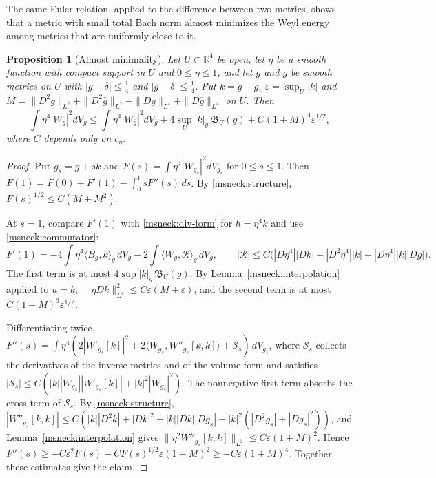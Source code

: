 \documentclass[11pt]{article}
\numberwithin{equation}{section}
\newtheorem{proposition}[theorem]{Proposition}
\theoremstyle{definition}
\theoremstyle{remark}
\begin{document}
The same Euler relation, applied to the difference between two metrics,
shows that a metric with small total Bach norm almost minimizes the Weyl
energy among metrics that are uniformly close to it.

\begin{proposition}[Almost minimality]\label{msneck:comparison}
Let \(U\subset\mathbb R^4\) be open, let \(\eta\) be a smooth function
with compact support in \(U\) and \(0\le\eta\le1\), and let \(g\) and
\(\bar g\) be smooth metrics on \(U\) with \(|g-\delta|\le\tfrac14\) and
\(|\bar g-\delta|\le\tfrac14\). Put \(k=g-\bar g\),
\(\varepsilon=\sup_U|k|\) and
\(M=\|D^2g\|_{L^2}+\|D^2\bar g\|_{L^2}+\|Dg\|_{L^4}+\|D\bar g\|_{L^4}\) on
\(U\). Then
\[
 \int\eta^4|W_g|^2dV_g\le\int\eta^4|W_{\bar g}|^2dV_{\bar g}
 +4\sup_U|k|_g\,\mathfrak B_U(g)+C(1+M)^4\varepsilon^{1/2},
\]
where \(C\) depends only on \(c_\eta\).
\end{proposition}

\begin{proof}
Put \(g_s=\bar g+sk\) and \(F(s)=\int\eta^4|W_{g_s}|^2dV_{g_s}\) for
\(0\le s\le1\). Then \(F(1)=F(0)+F'(1)-\int_0^1sF''(s)\,ds\). By
\eqref{msneck:structure}, \(F(s)^{1/2}\le C(M+M^2)\).

At \(s=1\), compare \(F'(1)\) with \eqref{msneck:div-form} for
\(h=\eta^4k\) and use \eqref{msneck:commutator}:
\[
 F'(1)=-4\int\eta^4\langle B_g,k\rangle_g\,dV_g
  -2\int\langle W_g,\mathcal R\rangle_g\,dV_g,\qquad
 |\mathcal R|\le C\bigl(|D\eta^4||Dk|+|D^2\eta^4||k|+|D\eta^4||k||Dg|\bigr).
\]
The first term is at most \(4\sup|k|_g\,\mathfrak B_U(g)\). By
Lemma~\ref{msneck:interpolation} applied to \(u=k\),
\(\|\eta Dk\|_{L^4}^2\le C\varepsilon(M+\varepsilon)\), and the second term is
at most \(C(1+M)^3\varepsilon^{1/2}\).

Differentiating twice,
\(F''(s)=\int\eta^4(2|W'_{g_s}[k]|^2+2\langle W_{g_s},W''_{g_s}[k,k]\rangle
+\mathcal S_s)\,dV_{g_s}\), where \(\mathcal S_s\) collects the derivatives
of the inverse metrics and of the volume form and satisfies
\(|\mathcal S_s|\le C(|k||W_{g_s}||W'_{g_s}[k]|+|k|^2|W_{g_s}|^2)\). The
nonnegative first term absorbs the cross term of \(\mathcal S_s\). By
\eqref{msneck:structure},
\(|W''_{g_s}[k,k]|\le C(|k||D^2k|+|Dk|^2+|k||Dk||Dg_s|
+|k|^2(|D^2g_s|+|Dg_s|^2))\), and Lemma~\ref{msneck:interpolation} gives
\(\|\eta^2W''_{g_s}[k,k]\|_{L^2}\le C\varepsilon(1+M)^2\). Hence
\(F''(s)\ge-C\varepsilon^2F(s)-CF(s)^{1/2}\varepsilon(1+M)^2\ge-C\varepsilon(1+M)^4\).
Together these estimates give the claim.
\end{proof}
\end{document}
